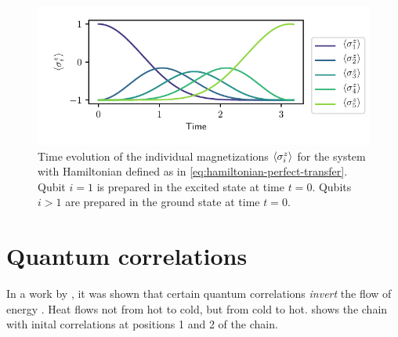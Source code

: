 \documentclass[a4paper,11pt]{scrartcl}
\begin{document}
\begin{figure}[H]
    \centering
    \includegraphics{expval_z.pdf}
    \caption{Time evolution of the individual magnetizations $\expval{\sigma^z_i}$ for the system with
    Hamiltonian defined as in \cref{eq:hamiltonian-perfect-transfer}.
    Qubit $i=1$ is prepared in the excited state at time $t=0$.
    Qubits $i>1$ are prepared in the ground state at time $t=0$.}
    \label{fig:no-corr}
\end{figure}
\section{Quantum correlations}
In a work by \citeauthor{BA_kaonan_correlations}, it was shown that certain quantum correlations
\emph{invert} the flow of energy \cite{BA_kaonan_correlations}. Heat flows not from hot to cold, but
from cold to hot.  shows the chain with inital correlations at positions 1 and 2 of the chain.




\printbibliography
\end{document}
